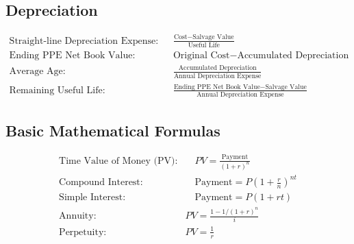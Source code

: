 \documentclass[12pt]{article}
\begin{document}
	\subsection{Depreciation}
\begin{tcolorbox}	
	\begin{align*}
		\text{Straight-line Depreciation Expense:} \quad & \frac{\text{Cost} - \text{Salvage Value}}{\text{Useful Life}} \\
		\text{Ending PPE Net Book Value:} \quad & \text{Original Cost} - \text{Accumulated Depreciation} \\
		\text{Average Age:} \quad & \frac{\text{Accumulated Depreciation}}{\text{Annual Depreciation Expense}} \\
		\text{Remaining Useful Life:} \quad & \frac{\text{Ending PPE Net Book Value} - \text{Salvage Value}}{\text{Annual Depreciation Expense}}
	\end{align*}
\end{tcolorbox}
	\subsection{Basic Mathematical Formulas}
\begin{tcolorbox}
	\begin{align*}
		\text{Time Value of Money (PV):} & \quad PV = \frac{\text{Payment}}{(1 + r)^n} \\
		\text{Compound Interest:} &  \quad \text{Payment} = P \left(1 + \frac{r}{n}\right)^{nt} \\
		\text{Simple Interest:} & \quad \text{Payment} = P  (1 + rt) \\
		\text{Annuity:} \quad &  PV=\frac{1-1/(1+r)^n}{i} \\
		\text{Perpetuity:} \quad & PV=\frac{1}{r} \\
	\end{align*}
\end{tcolorbox}
\end{document}
